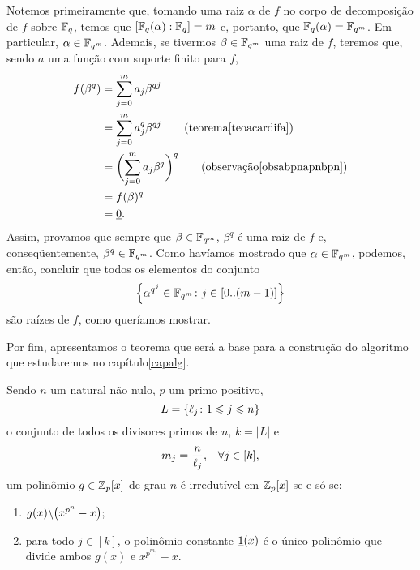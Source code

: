 \begin{dem}
  Notemos primeiramente que, tomando uma raiz $\alpha$ de $f$ no corpo
  de decomposição de $f$ sobre $\mathbb{F}_{q}$, temos que
  $[\mathbb{F}_{q}(\alpha):\mathbb{F}_{q}]=m$ e, portanto, que
  $\mathbb{F}_{q}(\alpha)=\mathbb{F}_{q^m}$. Em particular,
  $\alpha\in\mathbb{F}_{q^m}$. Ademais, se tivermos $\beta\in\mathbb{F}_{q^m}$
  uma raiz de $f$, teremos que, sendo $a$ uma função com suporte finito
  para $f$,
  \begin{equation*}
    \begin{aligned}
    f(\beta^q) &= \sum_{j=0}^m a_j\beta^{qj}\\
               &= \sum_{j=0}^m a_j^q\beta^{qj}
    \qquad\text{(teorema\xspace\ref{teoacardifa})}\\
               &= \biggl(\sum_{j=0}^m a_j\beta^j\biggr)^q
    \qquad\text{(observação\xspace\ref{obsabpnapnbpn})}\\
               &= f(\beta)^q \\ &= \zero\MMp
    \end{aligned}
  \end{equation*}
  Assim, provamos que sempre que $\beta\in\mathbb{F}_{q^m}$,
  $\beta^q$ é uma raiz de $f$ e, conseqüentemente,
  $\beta^q\in\mathbb{F}_{q^m}$. Como havíamos mostrado que
  $\alpha\in\mathbb{F}_{q^m}$, podemos, então, concluir que
  todos os elementos do conjunto
  \begin{equation*}
    \left\{ \alpha^{q^j}\in \mathbb{F}_{q^m}\colon j\in[0..(m-1)] \right\}
  \end{equation*}
  são raízes de $f$, como queríamos mostrar.
\end{dem}

Por fim, apresentamos o teorema que será a base para a construção do
algoritmo que estudaremos no capítulo\xspace\ref{capalg}.

\begin{Teo}\label{maint}
  Sendo $n$ um natural não nulo, $p$ um primo positivo,
  \begin{equation*}
    L=\left\{ \ell_j\colon1\leqslant j\leqslant n \right\}
  \end{equation*}
  o
  conjunto de todos os divisores primos de $n$, $k=|L|$ e
  \begin{equation*}
    m_j=\frac{n}{\ell_j}\mathrm{,}\quad\forall j\in[k]\mathrm{,}
  \end{equation*}
  um polinômio $g\in\mathbb{Z}_p[x]$ de grau
  $n$ é irredutível em $\mathbb{Z}_p[x]$ se e só se:
  \begin{enumerate}
    \item\label{mainti} $g(x)\backslash \bigl(x^{p^n} -x\bigr)$;
    \item\label{maintii} para todo $j\in[k]$, o polinômio constante
      $\underline{1}(x)$
    é o único polinômio que divide ambos $g(x)$ e $x^{p^{m_j}}-x$.
  \end{enumerate}
\end{Teo}

